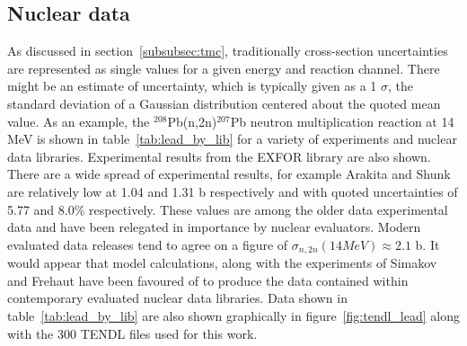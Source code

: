 \subsection{Nuclear data}
\label{subsec:data}
As discussed in section~\ref{subsubsec:tmc}, traditionally cross-section uncertainties are represented as single values for a given energy and reaction channel. There might be an estimate of uncertainty, which is typically given as a 1 $\sigma$, the standard deviation of a Gaussian distribution centered about the quoted mean value. As an example, the $^{208}$Pb(n,2n)$^{207}$Pb neutron multiplication reaction at 14 MeV is shown in table~\ref{tab:lead_by_lib} for a variety of experiments and nuclear data libraries. Experimental results from the EXFOR library are also shown. There are a wide spread of experimental results, for example Arakita and Shunk are relatively low at 1.04 and 1.31 b respectively and with quoted uncertainties of 5.77 and 8.0\% respectively. These values are among the older data experimental data and have been relegated in importance by nuclear evaluators. Modern evaluated data releases tend to agree on a figure of $\sigma_{n,2n}(14 MeV) \approx 2.1$ b. It would appear that model calculations, along with the experiments of Simakov and Frehaut have been favoured of to produce the data contained within contemporary evaluated nuclear data libraries. Data shown in table~\ref{tab:lead_by_lib} are also shown graphically in figure~\ref{fig:tendl_lead} along with the 300 TENDL files used for this work.


